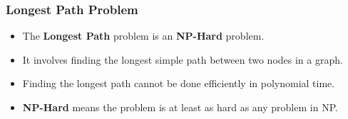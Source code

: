 \begin{frame}
    \frametitle{Longest Path Problem}
    \begin{itemize}
        \item The \textbf{Longest Path} problem is an \textbf{NP-Hard} problem.
        \item It involves finding the longest simple path between two nodes in a graph.
        \item Finding the longest path cannot be done efficiently in polynomial time.
        \item \textbf{NP-Hard} means the problem is at least as hard as any problem in NP.
    \end{itemize}
\end{frame}
%
%
%
%
%


